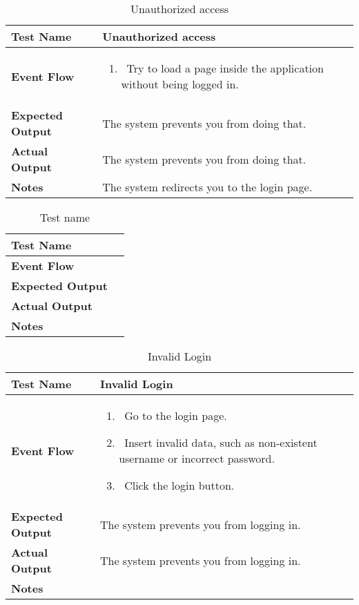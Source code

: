 \begin{table}[h]	
	\centering
	\def\arraystretch{1.5}
	\begin{tabular}{|m{7cm}|m{7cm}|}
		\hline
		\textbf{Test Name}            &  Unauthorized access  \\ \hline
		\textbf{Event Flow}             &  
			\begin{enumerate}
				\item~Try to load a page inside the application without being logged in.
			\end{enumerate}
		 \\ \hline
		\textbf{Expected Output}  &  The system prevents you from doing that.   \\ \hline
		\textbf{Actual Output}       &  The system prevents you from doing that.   \\ \hline
		\textbf{Notes} & The system redirects you to the login page. \\ \hline
	\end{tabular}
	\caption{Unauthorized access}
\end{table}


\begin{table}[h]	
	\centering
	\def\arraystretch{1.5}
	\begin{tabular}{|m{7cm}|m{7cm}|}
		\hline
		\textbf{Test Name}            &    \\ \hline
		\textbf{Event Flow}             &   \\ \hline
		\textbf{Expected Output}  &     \\ \hline
		\textbf{Actual Output}       &     \\ \hline
		\textbf{Notes} & \\ \hline
	\end{tabular}
	\caption{Test name}
\end{table}


\begin{table}[h]	
\centering
\def\arraystretch{1.5}
\begin{tabular}{|m{7cm}|m{7cm}|}
	\hline
	\textbf{Test Name}            &  Invalid Login  \\ \hline
	\textbf{Event Flow}             &  
		\begin{enumerate}
				\item~Go to the login page.
				\item~Insert invalid data, such as non-existent username or incorrect password.
				\item~Click the login button.
		\end{enumerate}
		 \\ \hline
	\textbf{Expected Output}  &  The system prevents you from logging in.  \\ \hline
	\textbf{Actual Output}       &  The system prevents you from logging in.   \\ \hline
	\textbf{Notes} & \\ \hline
\end{tabular}
\caption{Invalid Login}
\end{table}


